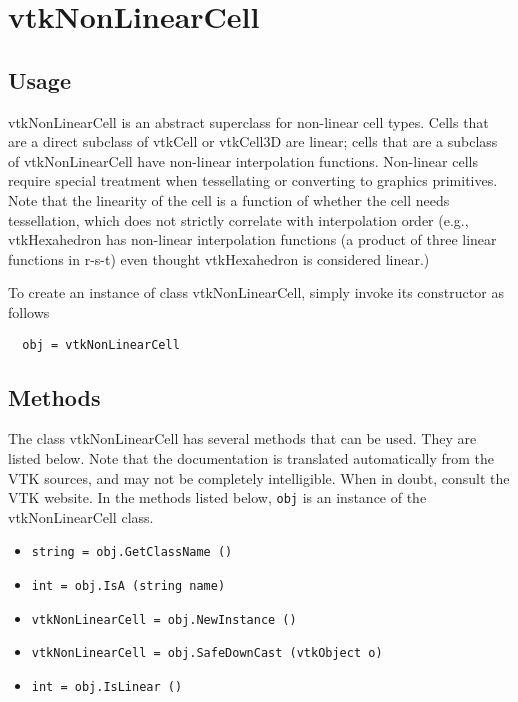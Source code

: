 \section{vtkNonLinearCell}

\subsection{Usage}

 vtkNonLinearCell is an abstract superclass for non-linear cell types.
 Cells that are a direct subclass of vtkCell or vtkCell3D are linear;
 cells that are a subclass of vtkNonLinearCell have non-linear interpolation
 functions. Non-linear cells require special treatment when tessellating
 or converting to graphics primitives. Note that the linearity of the cell
 is a function of whether the cell needs tessellation, which does not
 strictly correlate with interpolation order (e.g., vtkHexahedron has
 non-linear interpolation functions (a product of three linear functions
 in r-s-t) even thought vtkHexahedron is considered linear.)

To create an instance of class vtkNonLinearCell, simply
invoke its constructor as follows
\begin{verbatim}
  obj = vtkNonLinearCell
\end{verbatim}
\subsection{Methods}

The class vtkNonLinearCell has several methods that can be used.
  They are listed below.
Note that the documentation is translated automatically from the VTK sources,
and may not be completely intelligible.  When in doubt, consult the VTK website.
In the methods listed below, \verb|obj| is an instance of the vtkNonLinearCell class.
\begin{itemize}
\item  \verb|string = obj.GetClassName ()|

\item  \verb|int = obj.IsA (string name)|

\item  \verb|vtkNonLinearCell = obj.NewInstance ()|

\item  \verb|vtkNonLinearCell = obj.SafeDownCast (vtkObject o)|

\item  \verb|int = obj.IsLinear ()|

\end{itemize}
